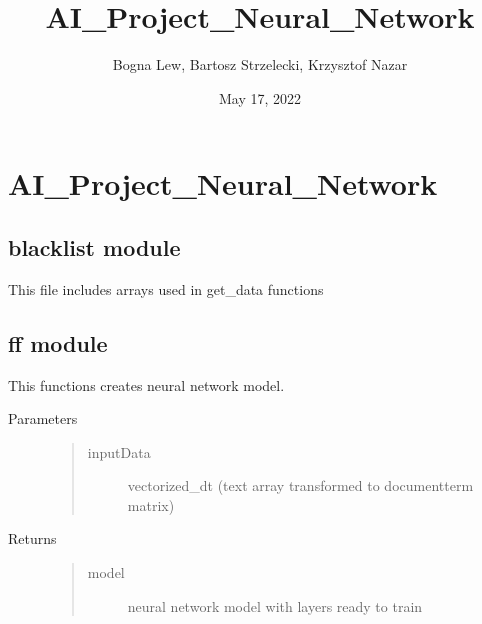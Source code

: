 \documentclass[letterpaper,10pt,english]{sphinxmanual}
\title{AI\_Project\_Neural\_Network}
\date{May 17, 2022}
\author{Bogna Lew, Bartosz Strzelecki, Krzysztof Nazar}
\begin{document}
\pagestyle{empty}
\sphinxmaketitle
\pagestyle{plain}
\sphinxtableofcontents
\pagestyle{normal}
\label{\detokenize{index::doc}}


\sphinxstepscope


\chapter{AI\_Project\_Neural\_Network}
\label{\detokenize{modules:ai-project-neural-network}}\label{\detokenize{modules::doc}}
\sphinxstepscope


\section{blacklist module}
\label{\detokenize{blacklist:module-blacklist}}\label{\detokenize{blacklist:blacklist-module}}\label{\detokenize{blacklist::doc}}
\sphinxAtStartPar
This file includes arrays used in get\_data functions

\sphinxstepscope


\section{ff module}
\label{\detokenize{ff:module-ff}}\label{\detokenize{ff:ff-module}}\label{\detokenize{ff::doc}}

\begin{fulllineitems}
\label{\detokenize{ff:ff.create_model}}
\pysigstartsignatures
{}
\pysigstopsignatures
\sphinxAtStartPar
This functions creates neural network model.
\begin{description}
\item[{Parameters}] \leavevmode\begin{quote}\begin{description}
\item[{inputData}] \leavevmode
\sphinxAtStartPar
vectorized\_dt (text array transformed to document\sphinxhyphen{}term matrix)

\end{description}\end{quote}

\item[{Returns}] \leavevmode\begin{quote}\begin{description}
\item[{model}] \leavevmode
\sphinxAtStartPar
neural network model with layers ready to train

\end{description}\end{quote}

\end{description}

\end{fulllineitems}
\end{document}
